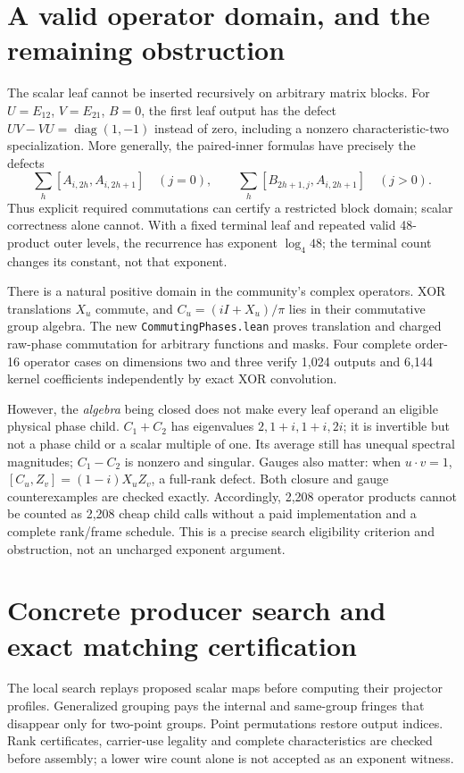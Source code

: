 \documentclass[11pt]{article}
\newcommand{\pii}{\pi}
\begin{document}
\section{A valid operator domain, and the remaining obstruction}
The scalar leaf cannot be inserted recursively on arbitrary matrix blocks.
For $U=E_{12}$, $V=E_{21}$, $B=0$, the first leaf output has the defect
$UV-VU=\operatorname{diag}(1,-1)$ instead of zero, including a nonzero
characteristic-two specialization. More generally, the paired-inner
formulas have precisely the defects
\[
 \sum_h[A_{i,2h},A_{i,2h+1}]
 \quad(j=0),\qquad
 \sum_h[B_{2h+1,j},A_{i,2h+1}]\quad(j>0).
\]
Thus explicit required commutations can certify a restricted block domain;
scalar correctness alone cannot. With a fixed terminal leaf and repeated
valid 48-product outer levels, the recurrence has exponent $\log_4 48$;
the terminal count changes its constant, not that exponent.

There is a natural positive domain in the community's complex operators.
XOR translations $X_u$ commute, and
$C_u=(iI+X_u)/\pii$ lies in their commutative group algebra. The new
\texttt{CommutingPhases.lean} proves translation and charged raw-phase
commutation for arbitrary functions and masks. Four complete order-16
operator cases on dimensions two and three verify 1,024 outputs and 6,144
kernel coefficients independently by exact XOR convolution.

However, the \emph{algebra} being closed does not make every leaf operand
an eligible physical phase child. $C_1+C_2$ has eigenvalues
$2,1+i,1+i,2i$; it is invertible but not a phase child or a scalar multiple
of one. Its average still has unequal spectral magnitudes; $C_1-C_2$ is
nonzero and singular. Gauges also matter:
when $u\cdot v=1$,
$[C_u,Z_v]=(1-i)X_uZ_v$, a full-rank defect. Both closure and gauge
counterexamples are checked exactly. Accordingly, 2,208 operator products
cannot be counted as 2,208 cheap child calls without a paid implementation
and a complete rank/frame schedule. This is a precise search eligibility
criterion and obstruction, not an uncharged exponent argument.

\section{Concrete producer search and exact matching certification}
The local search replays proposed scalar maps before computing their
projector profiles. Generalized grouping pays the internal and same-group
fringes that disappear only for two-point groups. Point permutations
restore output indices. Rank certificates, carrier-use legality and complete
characteristics are checked before assembly; a lower wire count alone is
not accepted as an exponent witness.
\end{document}
